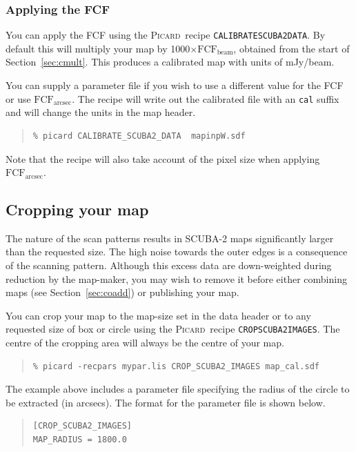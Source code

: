 \documentclass[twoside,11pt]{article}
\newcommand{\htmlref}[2]{#1}
\newcommand{\latexhtml}[2]{#1}
\newcommand{\xref}[3]{#1}
\newcommand{\xlabel}[1]{}
\renewcommand{\_}{\texttt{\symbol{95}}}
\newenvironment{myquote}{
   \color{MidnightBlue}\begin{quote}\begin{small}}{
   \end{small}\end{quote}
}
\newcommand{\fcfb}{$\mathrm{FCF_{beam}}$}
\newcommand{\fcfa}{$\mathrm{FCF_{arcsec}}$}
\newcommand{\picard}{\xref{\textsc{Picard}}{sun265}{}}
\newcommand{\drrecipe}[1]{\texttt{#1}}
\newcommand{\file}[1]{\texttt{#1}}
\newcommand{\cref}[3]{\latexhtml{#1~\ref{#2}}{\htmlref{#3}{#2}}}
\renewenvironment{myquote}{
      \begin{quote}\begin{small}}{
      \end{small}\end{quote}
   }
\begin{document}
\subsubsection{Applying the FCF}

You can apply the FCF using the \picard\ recipe
\xref{\drrecipe{CALIBRATE\_SCUBA2\_DATA}}{sun265}{CALIBRATE\_SCUBA2\_DATA}.
By default this will multiply your map by
1000$\times$\fcfb, obtained from the start of
\cref{Section}{sec:cmult}{Flux conversion factors}. This produces a
calibrated map with units of mJy/beam.

You can supply a parameter file if you wish to use a different value
for the FCF or use \fcfa. The recipe will write out the calibrated
file with an \file{\_cal} suffix and will change the units in the
map header.

\begin{myquote}
\begin{verbatim}
% picard CALIBRATE_SCUBA2_DATA  mapinpW.sdf
\end{verbatim}
\end{myquote}
Note that the recipe will also take account of the pixel size when
applying \fcfa.


\subsection{\xlabel{crop}Cropping your map}
\label{sec:crop}

The nature of the scan patterns results in SCUBA-2 maps significantly
larger than the requested size. The high noise towards the outer edges
is a consequence of the scanning pattern. Although this excess data are
down-weighted during reduction by the map-maker, you may wish to remove
it before either combining maps (see
\cref{Section}{sec:coadd}{Co-adding multiple maps}) or publishing your
map.

You can crop your map to the map-size set in the data header or
to any requested size of box or circle using the \picard\ recipe
\xref{\drrecipe{CROP\_SCUBA2\_IMAGES}}{sun265}{CROP\_SCUBA2\_IMAGES}.
The centre of the cropping area will always be the centre of your map.
\begin{myquote}
\begin{verbatim}
% picard -recpars mypar.lis CROP_SCUBA2_IMAGES map_cal.sdf
\end{verbatim}
\end{myquote}
The example above includes a parameter file specifying the radius of
the circle to be extracted (in arcsecs).  The format for the parameter
file is shown below.
\begin{center}
\begin{quote}
\begin{verbatim}
[CROP_SCUBA2_IMAGES]
MAP_RADIUS = 1800.0
\end{verbatim}
\end{quote}
\end{center}
\end{document}
